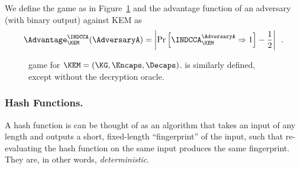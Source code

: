 	    \begin{definition}[\INDCCA]\label{def:indcca}
	    	We define the \INDCCA game as in Figure~\ref{fig:def:IND-CCA}
	    	and the \INDCCA advantage function of an adversary \AdversaryA (with binary output) against KEM as 
	    	\[
	    		\Advantage_{\KEM}^{\INDCCA}(\AdversaryA)
	    		= \left| \Pr\left[\INDCCA^{\AdversaryA}_\KEM \Rightarrow 1\right] - \frac{1}{2} \right| \enspace .
	    	\]
	    	\begin{figure}[ht]
	    		\begin{center}
	    		\end{center}
	    		\caption{
            \INDCCA game for $\KEM = (\KG, \Encaps, \Decaps)$.
            \INDCPA is similarly defined, except without the decryption oracle.
          }
	    		\label{fig:def:IND-CCA}
	    	\end{figure}
	    \end{definition}

    \subsubsection{Hash Functions.}
      A hash function is can be thought of as an algorithm that
        takes an input of any length and outputs a short, fixed-length
        ``fingerprint'' of the input, such that re-evaluating the hash function on
        the same input produces the same fingerprint. They are, in other words,
        \emph{deterministic}.


